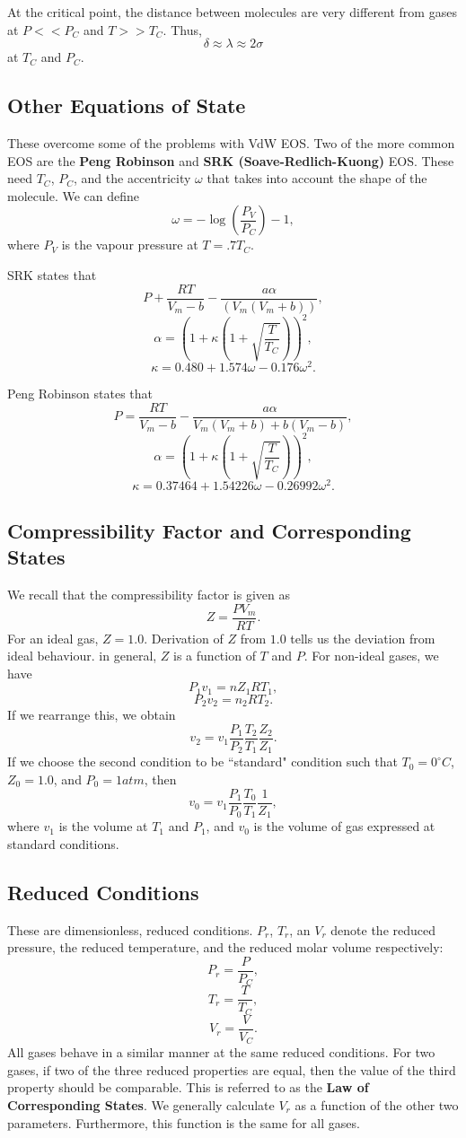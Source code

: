 \documentclass[11pt]{article}
\theoremstyle{plain} %
\theoremstyle{definition}
\theoremstyle{example}
\theoremstyle{remark}
\begin{document}
At the critical point, the distance between molecules are very different from gases at $P<<P_C$ and $T>> T_C$. Thus, 
$$\delta \approx \lambda \approx 2 \sigma$$
at $T_C$ and $P_C$. 
	
\subsection{Other Equations of State}

These overcome some of the problems with VdW EOS. Two of the more common EOS are the \textbf{Peng Robinson} and \textbf{SRK (Soave-Redlich-Kuong)} EOS. These need $T_C$, $P_C$, and the accentricity $\omega$ that takes into account the shape of the molecule. We can define 
$$\omega = -\log\left(\frac{P_V}{P_C}\right)-1,$$
where $P_V$ is the vapour pressure at $T = .7T_C$. 

SRK states that 
$$P + \frac{RT}{V_m-b}-\frac{a\alpha}{(V_m(V_m+b))},$$
$$\alpha = \left(1+\kappa\left(1+\sqrt{\frac{T}{T_C}}\right)\right)^2,$$ 
$$\kappa = 0.480+1.574\omega-0.176\omega^2.$$
	
Peng Robinson states that
$$P = \frac{RT}{V_m-b}-\frac{a\alpha}{V_m(V_m+b)+b(V_m-b)},$$
$$\alpha = \left(1+\kappa\left(1+\sqrt{\frac{T}{T_C}}\right)\right)^2,$$ 
$$\kappa = 0.37464+1.54226\omega-0.26992\omega^2.$$
	
\subsection{Compressibility Factor and Corresponding States}
We recall that the compressibility factor is given as 
$$Z = \frac{PV_m}{RT}.$$ For an ideal gas, $Z = 1.0$. Derivation of $Z$ from $1.0$ tells us the deviation from ideal behaviour. in general, $Z$ is a function of $T$ and $P$. For non-ideal gases, we have 
$$P_1v_1 = nZ_1RT_1,$$
$$P_2v_2=n_2RT_2.$$
If we rearrange this, we obtain 
$$v_2  = v_1\frac{P_1}{P_2}\frac{T_2}{T_1}\frac{Z_2}{Z_1}.$$
If we choose the second condition to be ``standard" condition such that $T_0 = 0^{\circ}C$, $Z_0 = 1.0$, and $P_0 = 1atm$, then 
$$v_0  = v_1\frac{P_1}{P_0}\frac{T_0}{T_1}\frac{1}{Z_1},$$
where $v_1$ is the volume at $T_1$ and $P_1$, and $v_0$ is the volume of gas expressed at standard conditions. 
	
	
\subsection{Reduced Conditions}
These are dimensionless, reduced conditions. $P_r$, $T_r$, an $V_r$ denote the reduced pressure, the reduced temperature, and the reduced molar volume respectively:
$$P_r = \frac{P}{P_C},$$
$$T_r = \frac{T}{T_C},$$	
$$V_r = \frac{V}{V_C}.$$
All gases behave in a similar manner at the same reduced conditions. For two gases, if two of the three reduced properties are equal, then the value of the third property should be comparable. This is referred to as the \textbf{Law of Corresponding States}. We generally calculate $V_r$ as a function of the other two parameters. Furthermore, this function is the same for all gases. 
\end{document}
